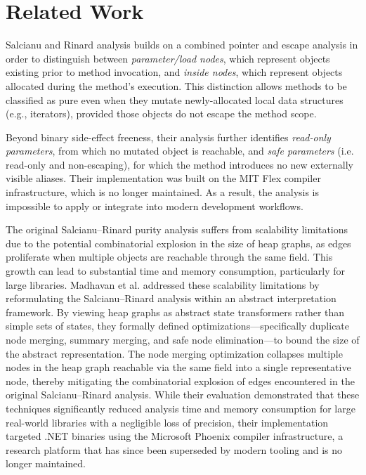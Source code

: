 \documentclass{article}
\begin{document}
\section{Related Work}

Salcianu and Rinard \cite{salcianu2005purity, salcianu2004combined} analysis builds on a combined pointer and escape analysis in order to distinguish between \emph{parameter/load nodes}, which represent objects existing prior to method invocation, and \emph{inside nodes}, which represent objects allocated during the method’s execution. This distinction allows methods to be classified as pure even when they mutate newly-allocated local data structures (e.g., iterators), provided those objects do not escape the method scope.

Beyond binary side-effect freeness, their analysis further identifies \emph{read-only parameters}, from which no mutated object is reachable, and \emph{safe parameters} (i.e. read-only and non-escaping), for which the method introduces no new externally visible aliases. Their implementation was built on the MIT Flex compiler infrastructure, which is no longer maintained. As a result, the analysis is impossible to apply or integrate into modern development workflows.

The original Salcianu--Rinard purity analysis suffers from scalability limitations due to the potential combinatorial explosion in the size of heap graphs, as edges proliferate when multiple objects are reachable through the same field. This growth can lead to substantial time and memory consumption, particularly for large libraries. Madhavan et al.\cite{MadhavanPurity2011} addressed these scalability limitations by reformulating the Salcianu--Rinard analysis within an abstract interpretation framework. By viewing heap graphs as abstract state transformers rather than simple sets of states, they formally defined optimizations—specifically duplicate node merging, summary merging, and safe node elimination—to bound the size of the abstract representation. The node merging optimization collapses multiple nodes in the heap graph reachable via the same field into a single representative node, thereby mitigating the combinatorial explosion of edges encountered in the original Salcianu--Rinard analysis. While their evaluation demonstrated that these techniques significantly reduced analysis time and memory consumption for large real-world libraries with a negligible loss of precision, their implementation targeted .NET binaries using the Microsoft Phoenix compiler infrastructure, a research platform that has since been superseded by modern tooling and is no longer maintained.
\end{document}
